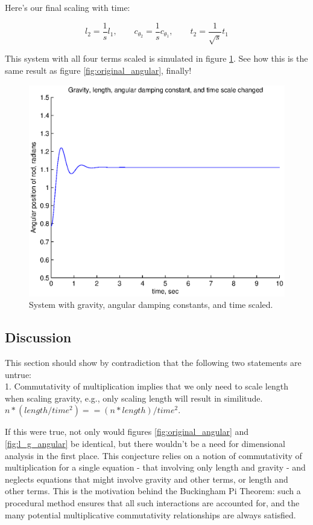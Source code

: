 \documentclass[12pt,letterpaper]{article}
\begin{document}
Here's our final scaling with time:

\[
l_2 = \frac{1}{s} l_1 , \quad \quad c_{\theta_2} = \frac{1}{s} c_{\theta_1}, \quad \quad t_2 = \frac{1}{\sqrt{s}} t_1
\]

This system with all four terms scaled is simulated in figure \ref{fig:l_g_c_t_angular}. See how this is the same result as figure \ref{fig:original_angular}, finally!

\begin{figure}[ht]
  \centering
  \includegraphics[width=.48\linewidth]{img/l_g_c_t_angular.eps}
  \caption{System with gravity, angular damping constants, and time scaled. }
  \label{fig:l_g_c_t_angular}
\end{figure}

\subsection{Discussion}

This section should show by contradiction that the following two statements are untrue: \\

1. Commutativity of multiplication implies that we only need to scale length when scaling gravity, e.g., only scaling length will result in similitude.
$n * (length / time^2) == (n * length) / time^2.$

If this were true, not only would figures \ref{fig:original_angular} and \ref{fig:l_g_angular} be identical, but there wouldn't be a need for dimensional analysis in the first place.
This conjecture relies on a notion of commutativity of multiplication for a single equation - that involving only length and gravity - and neglects equations that might involve gravity and other terms, or length and other terms.
This is the motivation behind the Buckingham Pi Theorem: such a procedural method ensures that all such interactions are accounted for, and the many potential multiplicative commutativity relationships are always satisfied.
\end{document}

